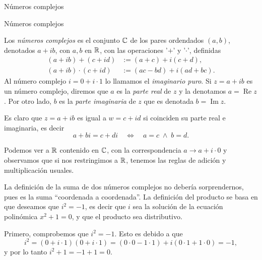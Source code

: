 \begin{chapter}{N\'umeros complejos}
\begin{section}{N\'umeros complejos}
    \begin{definicion}
        Los \textit{números complejos} es el conjunto $\mathbb C$  de los pares ordendados $(a,b)$,  denotados $a+ib$, con $a, b$  en $\mathbb R$, con las operaciones '$+$' y '$\cdot$', definidas
        \begin{align}
            (a+ib)+ (c+id)      & := (a+c) + i(c+d), \label{sumacompleja}          \\
            (a+ib) \cdot (c+id) & := (ac -bd) + i(ad+bc). \label{productocomplejo}
        \end{align}
        Al número complejo $i = 0 + i\cdot 1$ lo llamamos el \textit{imaginario puro}.  Si $z= a + ib$  es un número complejo,  diremos que $a$ es la \textit{parte real} de $z$ y  la denotamos $a = \operatorname{Re} z$. Por otro lado,  $b$ es la \textit{parte  imaginaria} de $z$ que es denotada $b = \operatorname{Im} z$.
    \end{definicion}

    Es claro  que $z=a+ib$ es igual a $w = c+id$ si coinciden su parte real e imaginaria, es decir
    \begin{equation*}
        a+ bi = c+ di\quad \Leftrightarrow\quad a=c \;\wedge\; b = d.
    \end{equation*}

    Podemos  ver a $\mathbb R$ contenido en $\mathbb C$,  con la correspondencia $a \to a + i \cdot 0$ y  observamos que si  nos restringimos a $\mathbb R$, tenemos las reglas de adición y  multiplicación usuales.

    La definición de la suma de dos números complejos no debería sorprendernos, pues es la suma ``coordenada a coordenada''. La definición del producto se basa en que deseamos que $i^2 = -1$,  es decir que $i$  sea la solución de la ecuación polinómica $x^2 + 1 =0$,   y que el producto sea distributivo.

    Primero, comprobemos que  $i^2 = -1$. Esto es debido a que
    \begin{equation*}
        i^2 = (0 + i\cdot 1)(0 + i\cdot 1) = (0\cdot 0 - 1 \cdot 1) + i(0\cdot 1 + 1 \cdot 0) = -1,
    \end{equation*}
    y por lo tanto $i^2 + 1 = -1+1 = 0$.



\end{section}
\end{chapter}
